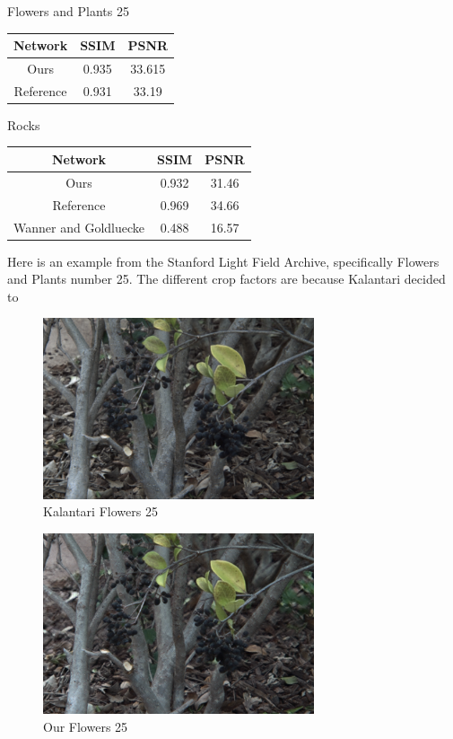 \documentclass[10pt,twocolumn,letterpaper]{article}
\begin{document}
\pagebreak

\begin{center}
Flowers and Plants 25

\begin{tabular}{|c c c|}
    Network & SSIM & PSNR \\ \hline
    Ours & 0.935 & 33.615 \\
    Reference & 0.931 & 33.19 \\ 
\end{tabular}
\end{center}

\medspace

\begin{center}
Rocks

\begin{tabular}{|c c c|}
    Network & SSIM & PSNR \\ \hline
    Ours & 0.932 & 31.46 \\
    Reference & 0.969 & 34.66 \\ 
    Wanner and Goldluecke & 0.488 & 16.57 
\end{tabular}
\end{center}


Here is an example from the Stanford Light Field Archive, specifically Flowers and Plants number 25.
The different crop factors are because Kalantari \etal decided to 

\begin{figure}[h]
\begin{center}
\caption{Kalantari \etal Flowers 25}
\includegraphics[width=8cm]{flowers_25/kalantari_05_05.png}
\end{center}
\end{figure}

\begin{figure}[h]
\begin{center}
\caption{Our Flowers 25}
\includegraphics[width=8cm]{flowers_25/ours_05_05.png}
\end{center}
\end{figure}
\end{document}
